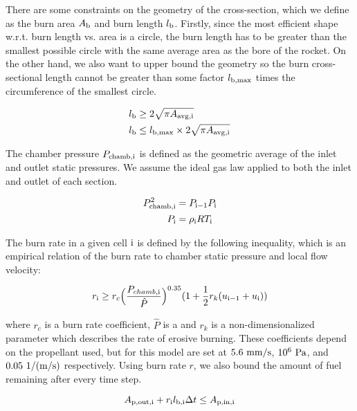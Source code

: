 There are some constraints on the geometry of the cross-section, which we define
as the burn area $A_{\rm{b}}$ and burn length $l_{\rm{b}}$. Firstly, since the most efficient
shape w.r.t. burn length vs. area is a circle, the burn length has to be greater than the smallest possible circle
with the same average area as the bore of the rocket. On the other hand, we also want to
upper bound the geometry so the burn cross-sectional length cannot be greater than some factor
$l_{\rm{b,max}}$ times the circumference of the smallest circle.

\begin{align}
    l_{\rm{b}} &\geq 2 \sqrt{\pi A_{\rm{avg, i}}} \\
    l_{\rm{b}} &\leq l_{\rm{b,max}} \times 2 \sqrt{\pi A_{\rm{avg, i}}}
\end{align}

The chamber pressure $P_{\rm{chamb}, \rm{i}}$ is defined as the geometric average of
the inlet and outlet static pressures. We assume the ideal gas law applied to both
the inlet and outlet of each section.

\begin{align}
    P_{\rm{chamb}, \rm{i}}^2 &= P_{\rm{i}-1} P_{\rm{i}} \\
    P_{\rm{i}} &= \rho_{\rm{i}} R T_{\rm{i}} \\
\end{align}

The burn rate in a given cell $\rm{i}$ is defined by the following inequality,
which is an empirical relation of the burn rate to chamber static
pressure and local flow velocity:

\begin{equation}
r_{\rm{i}} \geq r_c  \Big(\frac{P_{chamb,\rm{i}}}{\hat{P}}\Big)^{0.35} (1 + \frac{1}{2} r_k (u_{\rm{i}-1} + u_{\rm{i}}))
\end{equation}

where $r_c$ is a burn rate coefficient, $\hat{P}$ is a and $r_k$ is a non-dimensionalized parameter
which describes the rate of erosive burning. These coefficients
depend on the propellant used, but for this model are set at
$5.6~\rm{mm/s}$, $10^{6}~\rm{Pa}$, and $0.05~\rm{1/(m/s)}$ respectively. Using burn rate $r$,
we also bound the amount of fuel remaining after every time step.

\begin{equation}
    A_{\rm{p, out, i}} + r_{\rm{i}} l_{\rm{b, i}} \Delta t \leq A_{\rm{p, in, i}}
\end{equation}

